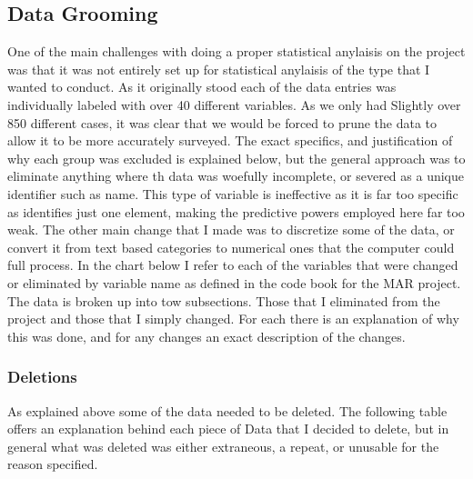 \documentclass[12pt]{article}
\begin{document}
\subsection{Data Grooming}
One of the main challenges with doing a proper statistical anylaisis on the project was that it was not entirely set up for statistical anylaisis of the type that I wanted to conduct. As it originally stood each of the data entries was individually labeled with over 40 different variables. As we only had Slightly over 850 different cases, it was clear that we would be forced to prune the data to allow it to be more accurately surveyed. The exact specifics, and justification of why each group was excluded is explained below, but the general approach was to eliminate anything where th data was woefully incomplete, or severed as a unique identifier such as name. This type of variable is ineffective as it is far too specific as identifies just one element, making the predictive powers employed here far too weak. The other main change that I made was to discretize some of the data, or convert it from text based categories to numerical ones that the computer could full process. In the chart below I refer to each of the variables that were changed or eliminated by variable name as defined in the code book for the MAR project. The data is broken up into tow subsections. Those that I eliminated from the project and those that I simply changed. For each there is an explanation of why this was done, and for any changes an exact description of the changes. 

\subsubsection{Deletions}
As explained above some of the data needed to be deleted. The following table offers an explanation behind each piece of Data that I decided to delete, but in general what was deleted was either extraneous, a repeat, or unusable for the reason specified. 

\vspace{5mm}
\end{document}
